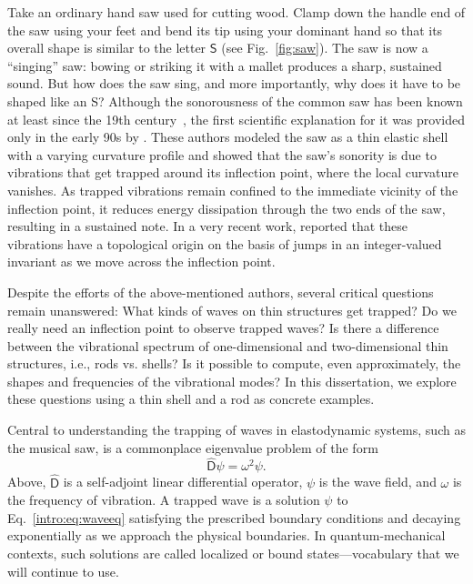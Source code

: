Take an ordinary hand saw used for cutting wood.
Clamp down the handle end of the saw using your feet and bend its tip using your dominant hand so that its overall shape is similar to the letter $\mathsf{S}$ (see Fig.~\ref{fig:saw}).
The saw is now a ``singing'' saw: bowing or striking it with a mallet produces a sharp, sustained sound.
But how does the saw sing, and more importantly, why does it have to be shaped like an \textsf{S}?
Although the sonorousness of the common saw has been known at least since the 19th century~\cite{stuckenbruck2016}, the first scientific explanation for it was provided only in the early 90s by \citet{scott1992}.
These authors modeled the saw as a thin elastic shell with a varying curvature profile and showed that the saw's sonority is due to vibrations that get trapped around its inflection point, where the local curvature vanishes.
As trapped vibrations remain confined to the immediate vicinity of the inflection point, it reduces energy dissipation through the two ends of the saw, resulting in a sustained note.
In a very recent work, \citet{shankar2022} reported that these vibrations have a topological origin on the basis of jumps in an integer-valued invariant as we move across the inflection point.

Despite the efforts of the above-mentioned authors, several critical questions remain unanswered:
What kinds of waves on thin structures get trapped?
Do we really need an inflection point to observe trapped waves?  Is there a difference between the vibrational spectrum of one-dimensional and two-dimensional thin structures, i.e., rods vs. shells?
Is it possible to compute, even approximately, the shapes and frequencies of the vibrational modes?
In this dissertation, we explore these questions using a thin shell and a rod as concrete examples.

Central to understanding the trapping of waves in elastodynamic systems, such as the musical saw, is a commonplace eigenvalue problem of the form
%
\begin{equation}
  \widehat{\mathsf{D}}\psi = \omega^{2}\psi.
  \label{intro:eq:waveeq}
\end{equation}
%
Above, $\widehat{\mathsf{D}}$ is a self-adjoint linear differential operator, $\psi$ is the wave field, and $\omega$ is the frequency of vibration.
A trapped wave is a solution $\psi$ to Eq.~\eqref{intro:eq:waveeq} satisfying the prescribed boundary conditions and decaying exponentially as we approach the physical boundaries.
In quantum-mechanical contexts, such solutions are called localized or bound states---vocabulary that we will continue to use.

